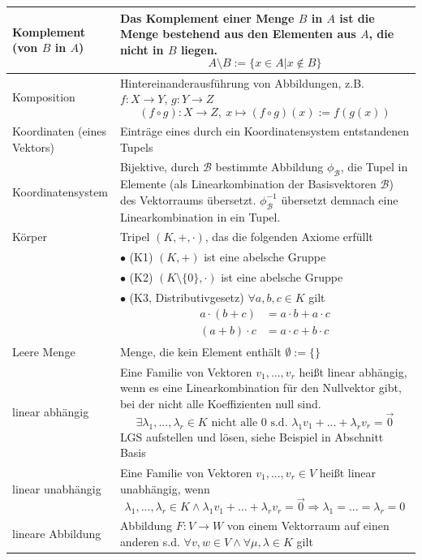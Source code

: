 \documentclass{article}
\begin{document}
\begin{xltabular}{\linewidth}{p{0.33\textwidth}|X}
	\hline
		Komplement (von $B$ in $A$) & Das Komplement einer Menge $B$ in $A$ ist die Menge bestehend aus den Elementen aus $A$, die nicht in $B$ liegen.
			$$A\setminus B := \{x\in A | x\notin B\}$$ \\
	\hline
		Komposition & Hintereinanderausführung von Abbildungen, z.B. $f:X\rightarrow Y$, $g:Y\rightarrow Z$
			$$(f\circ g):X\rightarrow Z,\ x\mapsto (f\circ g)(x) := f(g(x))$$ \\
	\hline
		Koordinaten (eines Vektors) & Einträge eines durch ein Koordinatensystem entstandenen Tupels \\
	\hline
		Koordinatensystem & Bijektive, durch $\mathcal{B}$ bestimmte Abbildung $\phi_{\mathcal{B}}$, die Tupel in Elemente (als Linearkombination der Basisvektoren $\mathcal{B}$) des Vektorraums übersetzt. $\phi_{\mathcal{B}}^{-1}$ übersetzt demnach eine Linearkombination in ein Tupel. \\
	\hline
		Körper & Tripel $(K,+,\cdot)$, das die folgenden Axiome erfüllt \\
			& $\bullet$ \textcolor{gruen}{(K1)} $(K,+)$ ist eine abelsche Gruppe \\
			& $\bullet$ \textcolor{gruen}{(K2)} $(K\setminus\{0\},\cdot)$ ist eine abelsche Gruppe \\
			& $\bullet$ \textcolor{gruen}{(K3, Distributivgesetz)} $\forall a,b,c\in K$  gilt
				{\begin{align*}
					a\cdot (b+c) &= a\cdot b + a\cdot c \\
					(a + b)\cdot c &= a\cdot c + b\cdot c
				\end{align*}} \\
	\hline
		Leere Menge & Menge, die kein Element enthält $\emptyset := \{\}$ \\
	\hline
		linear abhängig & Eine Familie von Vektoren $v_1,...,v_r$ heißt linear abhängig, wenn es eine Linearkombination für den Nullvektor gibt, bei der nicht alle Koeffizienten null sind.
			$$\exists \lambda_1,...,\lambda_r \in K \text{ nicht alle 0  s.d. } \lambda_1 v_1 + ... + \lambda_r v_r = \vec{0}$$ 
		\textcolor{gruen}{LGS aufstellen und lösen, siehe Beispiel in Abschnitt Basis}\\
	\hline
		linear unabhängig & Eine Familie von Vektoren $v_1,...,v_r\in V$ heißt linear unabhängig, wenn
			$$\lambda_1,...,\lambda_r\in K \wedge \lambda_1 v_1 + ... + \lambda_r v_r = \vec{0} \Rightarrow \lambda_1 = ... = \lambda_r = 0$$ \\
	\hline
		lineare Abbildung & Abbildung $F:V\rightarrow W$ von einem Vektorraum auf einen anderen s.d. $\forall v,w\in V \wedge \forall \mu,\lambda\in K$ gilt \\

\end{xltabular}
\end{document}
